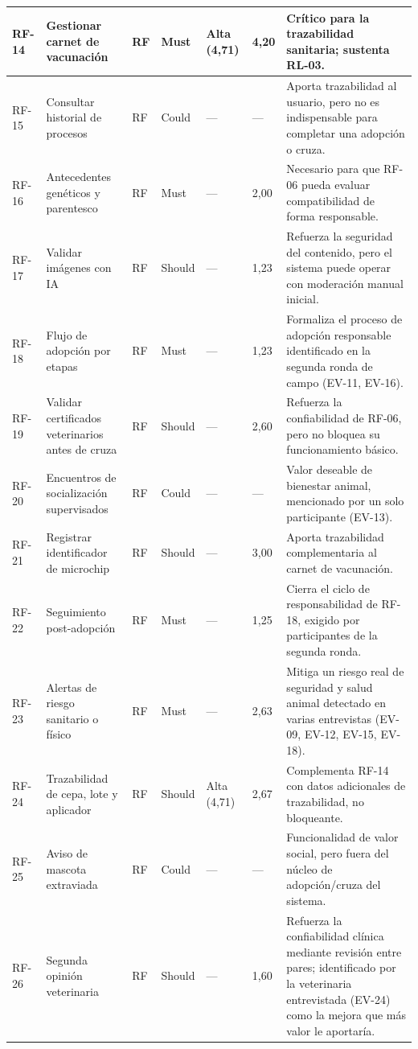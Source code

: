 \documentclass[journal,onecolumn]{IEEEtran}
\begin{document}
\begin{landscape}
\begin{longtable}{@{}p{1.2cm} p{5.2cm} p{1.0cm} p{1.3cm} p{1.3cm} p{1.1cm} p{6.5cm}@{}}
			RF-14 & Gestionar carnet de vacunación & RF & Must & Alta (4,71) & 4,20 & Crítico para la trazabilidad sanitaria; sustenta RL-03. \\ \midrule
			RF-15 & Consultar historial de procesos & RF & Could & --- & --- & Aporta trazabilidad al usuario, pero no es indispensable para completar una adopción o cruza. \\ \midrule
			RF-16 & Antecedentes genéticos y parentesco & RF & Must & --- & 2,00 & Necesario para que RF-06 pueda evaluar compatibilidad de forma responsable. \\ \midrule
			RF-17 & Validar imágenes con IA & RF & Should & --- & 1,23 & Refuerza la seguridad del contenido, pero el sistema puede operar con moderación manual inicial. \\ \midrule
			RF-18 & Flujo de adopción por etapas & RF & Must & --- & 1,23 & Formaliza el proceso de adopción responsable identificado en la segunda ronda de campo (EV-11, EV-16). \\ \midrule
			RF-19 & Validar certificados veterinarios antes de cruza & RF & Should & --- & 2,60 & Refuerza la confiabilidad de RF-06, pero no bloquea su funcionamiento básico. \\ \midrule
			RF-20 & Encuentros de socialización supervisados & RF & Could & --- & --- & Valor deseable de bienestar animal, mencionado por un solo participante (EV-13). \\ \midrule
			RF-21 & Registrar identificador de microchip & RF & Should & --- & 3,00 & Aporta trazabilidad complementaria al carnet de vacunación. \\ \midrule
			RF-22 & Seguimiento post-adopción & RF & Must & --- & 1,25 & Cierra el ciclo de responsabilidad de RF-18, exigido por participantes de la segunda ronda. \\ \midrule
			RF-23 & Alertas de riesgo sanitario o físico & RF & Must & --- & 2,63 & Mitiga un riesgo real de seguridad y salud animal detectado en varias entrevistas (EV-09, EV-12, EV-15, EV-18). \\ \midrule
			RF-24 & Trazabilidad de cepa, lote y aplicador & RF & Should & Alta (4,71) & 2,67 & Complementa RF-14 con datos adicionales de trazabilidad, no bloqueante. \\ \midrule
			RF-25 & Aviso de mascota extraviada & RF & Could & --- & --- & Funcionalidad de valor social, pero fuera del núcleo de adopción/cruza del sistema. \\ \midrule
			RF-26 & Segunda opinión veterinaria & RF & Should & --- & 1,60 & Refuerza la confiabilidad clínica mediante revisión entre pares; identificado por la veterinaria entrevistada (EV-24) como la mejora que más valor le aportaría. \\ \midrule

\end{longtable}
\end{landscape}
\end{document}
